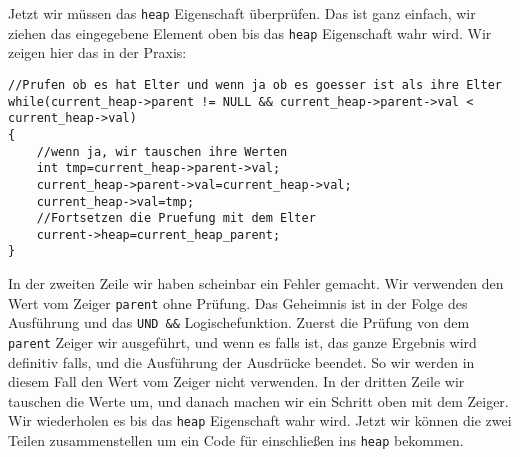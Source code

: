 Jetzt wir müssen das \texttt{heap} Eigenschaft überprüfen. Das ist ganz einfach, 
wir ziehen das eingegebene Element oben bis das \texttt{heap} Eigenschaft wahr wird.
Wir zeigen hier das in der Praxis:
\begin{lstlisting}
//Prufen ob es hat Elter und wenn ja ob es goesser ist als ihre Elter
while(current_heap->parent != NULL && current_heap->parent->val < current_heap->val) 
{
    //wenn ja, wir tauschen ihre Werten
    int tmp=current_heap->parent->val;
    current_heap->parent->val=current_heap->val;
    current_heap->val=tmp;
    //Fortsetzen die Pruefung mit dem Elter
    current->heap=current_heap_parent;
}
\end{lstlisting}
In der zweiten Zeile wir haben scheinbar ein Fehler gemacht. Wir verwenden
den Wert vom Zeiger \texttt{parent} ohne Prüfung. 
Das Geheimnis ist in der
Folge des Ausführung und das \texttt{UND \&\&} Logischefunktion.
Zuerst die Prüfung 
von dem \texttt{parent} Zeiger wir ausgeführt, und wenn es falls ist, das
ganze Ergebnis wird definitiv falls, und die Ausführung der Ausdrücke beendet. 
So wir werden in diesem Fall den Wert vom Zeiger nicht verwenden.
In der dritten Zeile wir tauschen die Werte um, und danach machen
wir ein Schritt oben mit dem Zeiger. Wir wiederholen es bis
das \texttt{heap} Eigenschaft wahr wird. Jetzt wir können die zwei Teilen
zusammenstellen um ein Code für einschließen ins \texttt{heap} bekommen.


